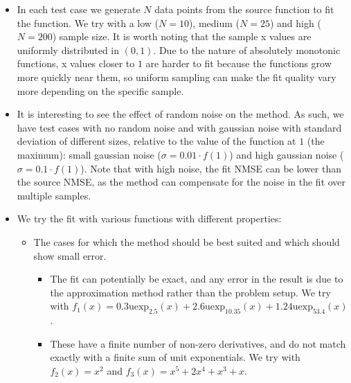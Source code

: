 \documentclass[12pt,a4paper]{article}
\newcommand{\uexp}[1] {{\text{uexp}_{#1}}}
\begin{document}
\begin{itemize}

\item {} In each test case we generate $N$ data points from the source function to fit the function. We try with a low ($N = 10$), medium ($N = 25$) and high ($N = 200$) sample size. It is worth noting that the sample x values are uniformly distributed in $(0,1)$. Due to the nature of absolutely monotonic functions, x values closer to $1$ are harder to fit because the functions grow more quickly near them, so uniform sampling can make the fit quality vary more depending on the specific sample.
\item {} It is interesting to see the effect of random noise on the method. As such, we have test cases with no random noise and with gaussian noise with standard deviation of different sizes, relative to the value of the function at $1$ (the maximum): small gaussian noise ($\sigma = 0.01 \cdot f(1)$) and high gaussian noise ($\sigma = 0.1 \cdot f(1)$). Note that with high noise, the fit NMSE can be lower than the source NMSE, as the method can compensate for the noise in the fit over multiple samples.
\item {} We try the fit with various functions with different properties:
\begin{itemize}
\item {} The cases for which the method should be best suited and which should show small error.
\begin{itemize}
\item {} The fit can potentially be exact, and any error in the result is due to the approximation method rather than the problem setup. We try with $f_1(x) = 0.3 \uexp{2.5}(x) + 2.6 \uexp{10.35}(x) + 1.24 \uexp{53.4}(x)$.
\item {} These have a finite number of non-zero derivatives, and do not match exactly with a finite sum of unit exponentials. We try with $f_2(x) = x^2$ and $f_3(x) = x^5 + 2 x^4 + x^3 + x$.
\end{itemize}


\end{itemize}
\end{itemize}
\end{document}
